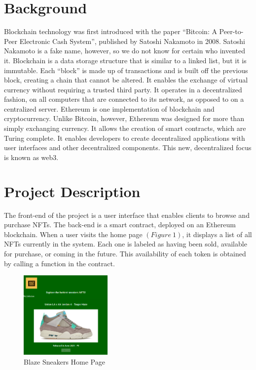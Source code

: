 \documentclass{article}
\begin{document}
\section{Background}
    Blockchain technology was first introduced with the paper ``Bitcoin: A Peer-to-Peer Electronic Cash System'', 
    published by Satoshi Nakamoto in 2008.
    Satoshi Nakamoto is a fake name, however, so we do not know for certain who invented it.
    Blockchain is a data storage structure that is similar to a linked list, but it is immutable.
    Each ``block'' is made up of transactions and is built off the previous block, creating a chain that cannot be altered.
    It enables the exchange of virtual currency without requiring a trusted third party.
    It operates in a decentralized fashion, on all computers that are connected to its network, 
    as opposed to on a centralized server.
    \newline
    \indent
    Ethereum is one implementation of blockchain and cryptocurrency.
    Unlike Bitcoin, however, Ethereum was designed for more than simply exchanging currency. 
    It allows the creation of smart contracts, which are Turing complete. 
    It enables developers to create decentralized applications with user interfaces and other decentralized components.
    This new, decentralized focus is known as web3.

\section{Project Description}
    The front-end of the project is a user interface that enables clients to browse and purchase NFTs.
    The back-end is a smart contract, deployed on an Ethereum blockchain.
    When a user visits the home page $( Figure~1 )$, it displays a list of all NFTs currently in the system. 
    Each one is labeled as having been sold, available for purchase, or coming in the future.
    This availability of each token is obtained by calling a function in the contract.
    
\begin{figure}[!h]
    \centering
    \includegraphics[width=0.4\textwidth]{HomePage.png}
    \caption{Blaze Sneakers Home Page}
\end{figure}
    
\end{document}
